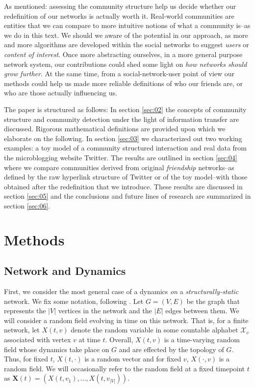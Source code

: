 \documentclass[12pt]{article}
\begin{document}
    As mentioned: assessing the community structure help us decide whether our redefinition of our
networks is actually worth it. Real-world communities are entities that we can compare to more
intuitive notions of what a community is--as we do in this text. We should we aware of the potential
in our approach, as more and more algorithms are developed within the social networks to suggest
\emph{users} or \emph{content of interest}. Once more abstracting ourselves, in a more general
purpose network system, our contributions could shed some light on \emph{how networks should grow
further}. At the same time, from a social-network-user point of view our methods could help us made
more reliable definitions of who our friends are, or who are those actually influencing us.

    The paper is structured as follows: In section \ref{sec:02} the concepts of community structure
and community detection under the light of information transfer are discussed. Rigorous mathematical
definitions are provided upon which we elaborate on the following. In section \ref{sec:03} we
characterized out two working examples: a toy model of a community structured interaction and real
data from the microblogging website Twitter. The results are outlined in section \ref{sec:04} where
we compare communities derived from original \emph{friendship} networks--as defined by the raw
hyperlink structure of Twitter or of the toy model--with those obtained after the redefinition that
we introduce. These results are discussed in section \ref{sec:05} and the conclusions and future
lines of research are summarized in section \ref{sec:06}.

\section{Methods}

\subsection{Network and Dynamics}

First, we consider the most general case of a dynamics \emph{on} a \emph{structurally-static} network. We fix some notation, following \cite{kolaczyk2009statistical}. Let $G = (V, E)$ be the graph that represents the $|V|$ vertices in the network and the $|E|$ edges between them. We will consider a random field evolving in time on this network. That is, for a finite network, let $X(t, v)$ denote the random variable in some countable alphabet $\mathcal{X}_{v}$ associated with vertex $v$ at time $t$. Overall, $X(t, v)$ is a time-varying random field whose dynamics take place on $G$ and are effected by the topology of $G$. Thus, for fixed $t$, $X(t, \cdot)$ is a random vector and for fixed $v$, $X(\cdot, v)$ is a random field. We will occasionally refer to the random field at a fixed timepoint $t$ as $\mathbf{X}(t) = (X(t, v_{1}), \ldots, X(t, v_{|V|})).$
\end{document}
